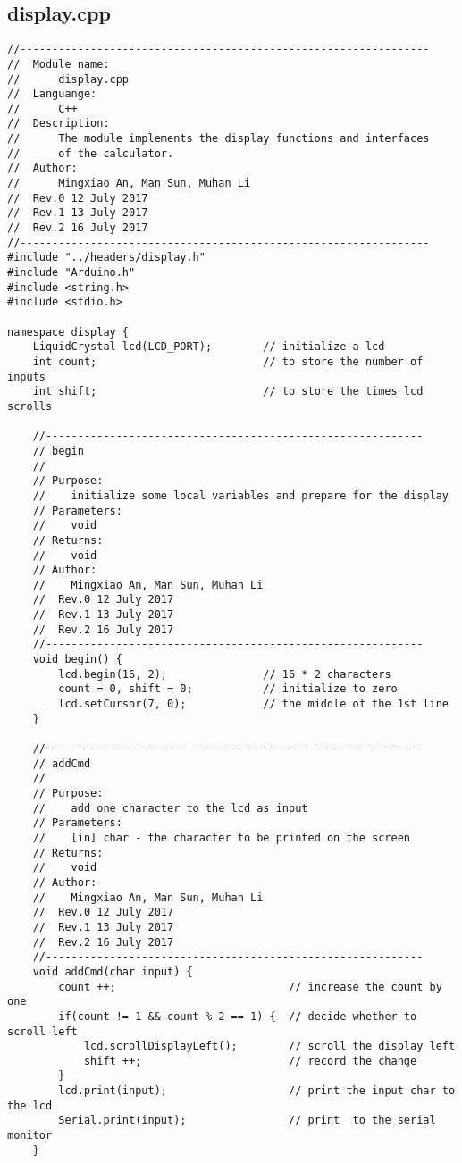 \subsection{display.cpp}
\begin{verbatim}
//----------------------------------------------------------------
//  Module name:
//      display.cpp
//  Languange:
//      C++
//  Description:
//      The module implements the display functions and interfaces
//      of the calculator.
//  Author:
//      Mingxiao An, Man Sun, Muhan Li
//  Rev.0 12 July 2017
//  Rev.1 13 July 2017
//  Rev.2 16 July 2017
//----------------------------------------------------------------
#include "../headers/display.h"
#include "Arduino.h" 
#include <string.h>
#include <stdio.h>

namespace display {
    LiquidCrystal lcd(LCD_PORT);        // initialize a lcd
    int count;                          // to store the number of inputs
    int shift;                          // to store the times lcd scrolls
    
    //-----------------------------------------------------------  
    // begin
    //  
    // Purpose:  
    //    initialize some local variables and prepare for the display
    // Parameters:  
    //    void  
    // Returns:  
    //    void  
    // Author:  
    //    Mingxiao An, Man Sun, Muhan Li
    //  Rev.0 12 July 2017
    //  Rev.1 13 July 2017
    //  Rev.2 16 July 2017
    //-----------------------------------------------------------  
    void begin() {
        lcd.begin(16, 2);               // 16 * 2 characters
        count = 0, shift = 0;           // initialize to zero
        lcd.setCursor(7, 0);            // the middle of the 1st line
    }

    //-----------------------------------------------------------  
    // addCmd 
    //  
    // Purpose:  
    //    add one character to the lcd as input   
    // Parameters:  
    //    [in] char - the character to be printed on the screen  
    // Returns:  
    //    void  
    // Author:  
    //    Mingxiao An, Man Sun, Muhan Li
    //  Rev.0 12 July 2017
    //  Rev.1 13 July 2017
    //  Rev.2 16 July 2017
    //-----------------------------------------------------------  
    void addCmd(char input) {
        count ++;                           // increase the count by one 
        if(count != 1 && count % 2 == 1) {  // decide whether to scroll left
            lcd.scrollDisplayLeft();        // scroll the display left
            shift ++;                       // record the change
        }
        lcd.print(input);                   // print the input char to the lcd
        Serial.print(input);                // print  to the serial monitor
    }
    

\end{verbatim}
